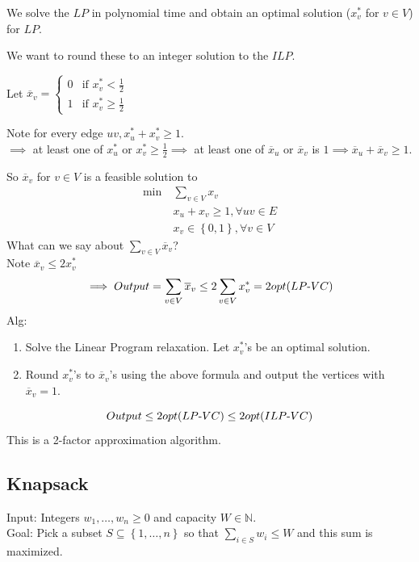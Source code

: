 \documentclass[12 pt]{article}
\begin{document}
          We solve the $LP$ in polynomial time and obtain an optimal
          solution ($x_v^*$ for $v\in V$) for $LP$.

          We want to round these to an integer solution to the $ILP$.

          Let $\overline{x}_v =
          \begin{cases}
            0 & \text{if }x_v^* < \frac{1}{2}
            \\ 1 & \text{if }x_v^* \geq \frac{1}{2}
          \end{cases}
          $

          Note for every edge $uv, x_u^* + x_v^* \geq 1$.
          \\ $\implies$ at least one of $x_u^*$ or $x_v^* \geq
          \frac{1}{2} \implies$ at least one of $\overline{x}_u$ or
          $\overline{x}_v$ is $1 \implies \overline{x}_u +
          \overline{x}_v \geq 1$.

          So $\overline{x}_v$ for $v \in V$ is a feasible solution to
          \begin{align*}
            \min \ &\sum_{v \in V} x_v
            \\ & x_u+x_v \geq 1, \forall uv \in E
            \\ & x_v \in \left\{0,1\right\}, \forall v \in V
          \end{align*}
          What can we say about $\sum_{v\in V}\overline{x}_v$?
          \\ Note $\overline{x}_v \leq 2 x_v^*$
          $$\implies Output = \sum_{v \in
            V}\overline{x}_v \leq 2 \sum_{v \in V}x^*_v = 2
          opt(LP\hbox{-}VC)$$
          Alg:
          \begin{enumerate}
          \item Solve the Linear Program relaxation. Let $x_v^*$'s be
            an optimal solution.
          \item Round $x_v^*$'s to $\overline{x}_v$'s using the above
            formula and output the vertices with $\overline{x}_v = 1$.
          \end{enumerate}
          $$Output \leq 2 opt(LP\hbox{-}VC)\leq 2 opt(ILP\hbox{-}VC)$$
          This is a 2-factor approximation algorithm.
          \subsection{Knapsack}
          Input: Integers $w_1, \ldots, w_n \geq 0$ and capacity $W
          \in \mathbb{N}$.
          \\ Goal: Pick a subset $S \subseteq
          \left\{1,\ldots,n\right\}$ so that $\sum_{i\in S}w_i \leq W$
          and this sum is maximized.
\end{document}
